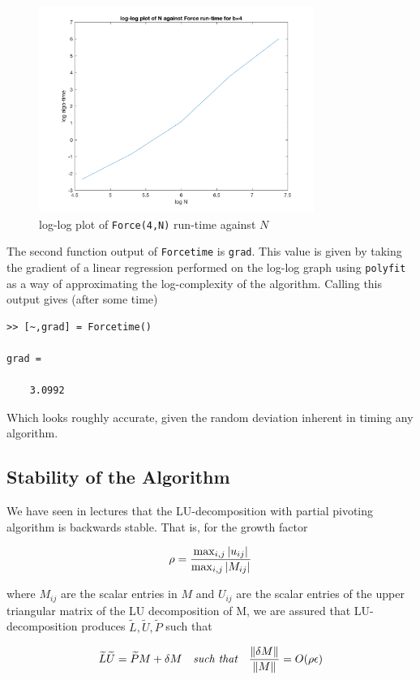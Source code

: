 \documentclass[paper=a4, fontsize=12pt]{scrartcl} %
\numberwithin{equation}{section}       %
\numberwithin{figure}{section}         %
\numberwithin{table}{section}          %
\begin{document}
\begin{figure}[h!]
  \centering
  \includegraphics[width=0.8\textwidth]{log-log_plot_Force.png}
  \caption{log-log plot of \texttt{Force(4,N)} run-time against $N$} 
  \label{fig:Forcelog}
\end{figure}

\noindent The second function output of \texttt{Forcetime} is \texttt{grad}. This value is given by taking the gradient of a linear regression performed on the log-log graph using \texttt{polyfit} as a way of approximating the log-complexity of the algorithm. Calling this output gives (after some time)
\begin{verbatim}
>> [~,grad] = Forcetime()

grad =

    3.0992
\end{verbatim}
Which looks roughly accurate, given the random deviation inherent in timing any algorithm. 

\subsection{Stability of the Algorithm} 
We have seen in lectures that the LU-decomposition with partial pivoting algorithm is backwards stable. That is, for the growth factor 

$$ \rho = \frac{\max_{i,j} \abs{u_{ij}} } {\max_{i,j} \abs{M_{ij}}} $$

\noindent where $M_{ij}$ are the scalar entries in $M$ and $U_{ij}$ are the scalar entries of the upper triangular matrix of the LU decomposition of M, we are assured that LU-decomposition produces $\widetilde{L},\widetilde{U},\widetilde{P}$ such that 

$$ \widetilde{L}\widetilde{U} = \widetilde{P} M + \delta M \quad \textit{such that} \quad \frac{\norm{\delta M}}{\norm{ M}} = O(\rho \epsilon) $$
\end{document}
